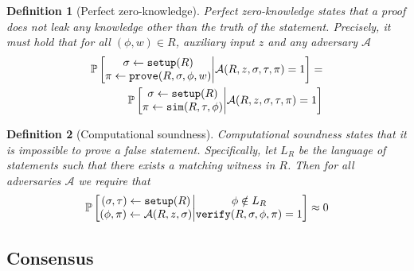 \documentclass{article}
\newtheorem{definition}{Definition}
\theoremstyle{remark}
\renewcommand{\P}{\mathbb{P}}
\begin{document}
\begin{definition}[Perfect zero-knowledge]
	Perfect zero-knowledge states that a proof does not leak any knowledge
	other than the truth of the statement. Precisely, it must hold that for all
	$(\phi, w) \in R$, auxiliary input $z$ and any adversary $\mathcal{A}$
	\begin{align*}
		\P\left[
			\begin{matrix}
				\sigma \leftarrow \textup{\texttt{setup}}(R) \\
				\pi \leftarrow \textup{\texttt{prove}}(R, \sigma, \phi, w)
			\end{matrix}
			\middle|
			\mathcal{A}(R, z, \sigma, \tau, \pi) = 1
		\right]
		=\\
		\P\left[
			\begin{matrix}
				\sigma \leftarrow \textup{\texttt{setup}}(R) \\
				\pi \leftarrow \textup{\texttt{sim}}(R, \tau, \phi)
			\end{matrix}
			\middle|
			\mathcal{A}(R, z, \sigma, \tau, \pi) = 1
		\right]
	\end{align*}
\end{definition}

\begin{definition}[Computational soundness]
	Computational soundness states that it is impossible to prove a false
	statement. Specifically, let $L_R$ be the language of statements such that
	there exists a matching witness in $R$. Then for all adversaries
	$\mathcal{A}$ we require that
	\begin{align*}
		\P\left[
			\begin{matrix}
				(\sigma, \tau) \leftarrow \textup{\texttt{setup}}(R) \\
				(\phi, \pi) \leftarrow \mathcal{A}(R, z, \sigma)
			\end{matrix}
			\middle|
			\begin{matrix}
				\phi \notin L_R\\
				\textup{\texttt{verify}}(R, \sigma, \phi, \pi) = 1
			\end{matrix}
		\right]
		\approx
		0
	\end{align*}
\end{definition}

\subsection{Consensus}

\newcommand{\consrng}[2]{\rho_\texttt{RNG}^{#1, #2}}
\end{document}
